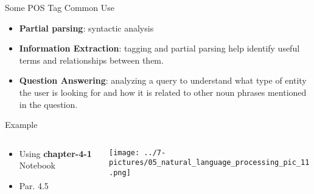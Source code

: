 \documentclass[11pt]{beamer}
\begin{document}
\begin{frame}{Some POS Tag Common Use}
	\begin{itemize}
		\item \textbf{Partial parsing}: syntactic analysis
		\item \textbf{ Information Extraction}: tagging and partial parsing help identify useful terms and relationships between them.
		\item \textbf{ Question Answering}: analyzing a query to understand what type of entity the user is looking for and how it is related to other noun phrases mentioned in the question.
	\end{itemize}
\end{frame}
\begin{frame}{Example}
\begin{columns}[T] %
\begin{column}{.48\textwidth}
        \begin{itemize}
		\item Using \textbf{chapter-4-1} Notebook 
		\item Par. 4.5
        \end{itemize}
\end{column}%
\hfill%
\begin{column}{.48\textwidth}
        \texttt{[image: ../7-pictures/05\_natural\_language\_processing\_pic\_11.png]}
\end{column}%
\end{columns}
\end{frame}

\end{document}
